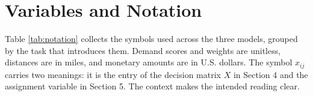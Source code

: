 \documentclass[12pt]{article}
\begin{document}
\section{Variables and Notation}

Table \ref{tab:notation} collects the symbols used across the three models, grouped by the
task that introduces them. Demand scores and weights are unitless, distances are in miles,
and monetary amounts are in U.S. dollars. The symbol $x_{ij}$ carries two meanings: it is
the entry of the decision matrix $X$ in Section 4 and the assignment variable in Section 5.
The context makes the intended reading clear.
\end{document}
